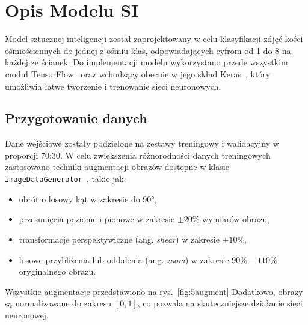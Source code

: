 \section{Opis Modelu SI}\label{sec:opis-modelu-si}

Model sztucznej inteligencji został zaprojektowany w celu klasyfikacji zdjęć kości ośmiościennych do jednej z ośmiu klas,
odpowiadających cyfrom od 1 do 8 na każdej ze ścianek.
Do implementacji modelu wykorzystano przede wszystkim moduł TensorFlow~\cite{tensorflow_docs}
oraz wchodzący obecnie w jego skład Keras~\cite{keras_docs},
który umożliwia łatwe tworzenie i trenowanie sieci neuronowych.

\subsection{Przygotowanie danych}\label{subsec:przygotowanie-danych}

Dane wejściowe zostały podzielone na zestawy treningowy i walidacyjny w proporcji 70:30.
W celu zwiększenia różnorodności danych treningowych zastosowano techniki augmentacji obrazów dostępne w klasie
\texttt{ImageDataGenerator}~\cite{keras_imagedatagenerator}, takie jak:

\begin{itemize}
    \item obrót o losowy kąt w zakresie do 90°,
    \item przesunięcia poziome i pionowe w zakresie $\pm 20\%$ wymiarów obrazu,
    \item transformacje perspektywiczne (ang. \textit{shear}) w zakresie $\pm 10\%$,
    \item losowe przybliżenia lub oddalenia (ang. \textit{zoom}) w zakresie $90\%-110\%$ oryginalnego obrazu.
\end{itemize}

Wszystkie augmentacje przedstawiono na rys.~\ref{fig:5augment}
Dodatkowo, obrazy są normalizowane do zakresu $[0, 1]$, co pozwala na skuteczniejsze działanie sieci neuronowej.

